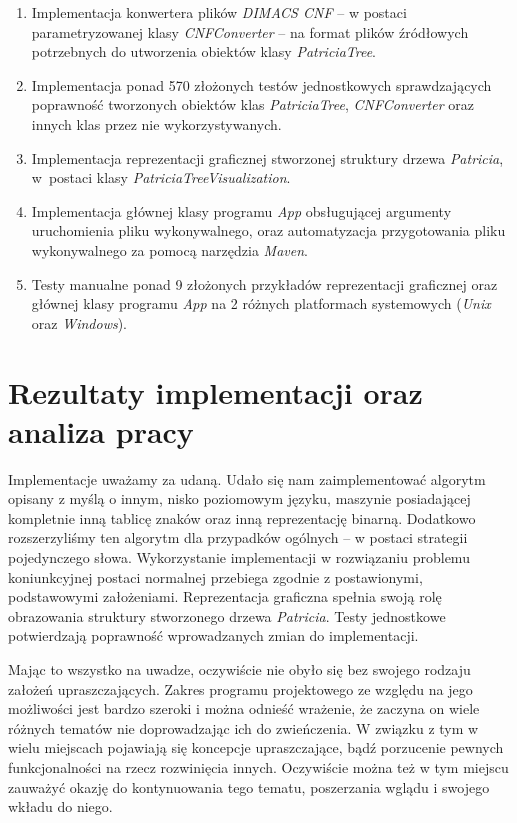 \begin{enumerate}
	    \item Implementacja konwertera plików \emph{DIMACS CNF} -- w postaci parametryzowanej klasy \emph{CNFConverter} -- na format plików źródłowych potrzebnych do utworzenia obiektów klasy \emph{PatriciaTree}.
	    
	    \item Implementacja ponad 570 złożonych testów jednostkowych sprawdzających poprawność tworzonych obiektów klas \emph{PatriciaTree}, \emph{CNFConverter} oraz innych klas przez nie wykorzystywanych.
	    
	    \item Implementacja reprezentacji graficznej stworzonej struktury drzewa \emph{Patricia}, w~postaci klasy \emph{PatriciaTreeVisualization}.
	    
	    \item Implementacja głównej klasy programu \emph{App} obsługującej argumenty uruchomienia pliku wykonywalnego, oraz automatyzacja przygotowania pliku wykonywalnego za pomocą narzędzia \emph{Maven}.
	    
	    \item Testy manualne ponad 9 złożonych przykładów reprezentacji graficznej oraz głównej klasy programu \emph{App} na 2 różnych platformach systemowych (\emph{Unix} oraz \emph{Windows}).
	\end{enumerate}
	
	\section{Rezultaty implementacji oraz analiza pracy}\label{sec:czescPraktycznaRezultatyImplementacji}
	
	Implementacje uważamy za udaną. Udało się nam zaimplementować algorytm opisany z myślą o innym, nisko poziomowym języku, maszynie posiadającej kompletnie inną tablicę znaków oraz inną reprezentację binarną. Dodatkowo rozszerzyliśmy ten algorytm dla przypadków ogólnych -- w postaci strategii pojedynczego słowa. Wykorzystanie implementacji w rozwiązaniu problemu koniunkcyjnej postaci normalnej przebiega zgodnie z postawionymi, podstawowymi założeniami. Reprezentacja graficzna spełnia swoją rolę obrazowania struktury stworzonego drzewa \emph{Patricia}. Testy jednostkowe potwierdzają poprawność wprowadzanych zmian do implementacji.
	
	Mając to wszystko na uwadze, oczywiście nie obyło się bez swojego rodzaju założeń upraszczających. Zakres programu projektowego ze względu na jego możliwości jest bardzo szeroki i można odnieść wrażenie, że zaczyna on wiele różnych tematów nie doprowadzając ich do zwieńczenia. W związku z tym w wielu miejscach pojawiają się koncepcje upraszczające, bądź porzucenie pewnych funkcjonalności na rzecz rozwinięcia innych. Oczywiście można też w tym miejscu zauważyć okazję do kontynuowania tego tematu, poszerzania wglądu i swojego wkładu do niego.
	
